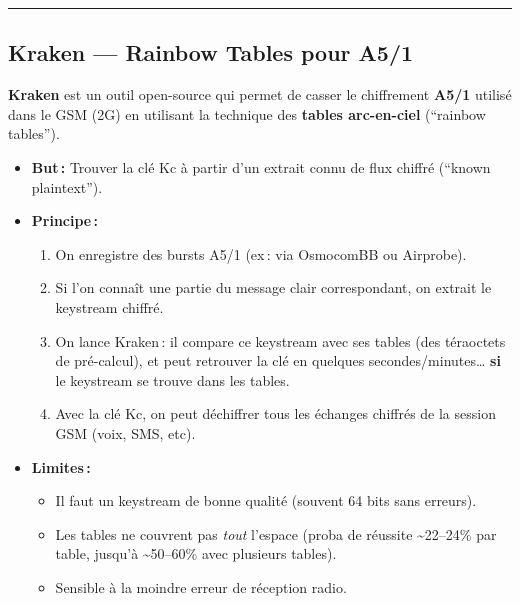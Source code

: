 \documentclass[
  french,
]{article}
\providecommand{\tightlist}{%
  \setlength{\itemsep}{0pt}\setlength{\parskip}{0pt}}
\begin{document}
\begin{center}\rule{0.5\linewidth}{0.5pt}\end{center}

\subsection{Kraken --- Rainbow Tables pour
A5/1}\label{kraken-rainbow-tables-pour-a51}

\textbf{Kraken} est un outil open-source qui permet de casser le
chiffrement \textbf{A5/1} utilisé dans le GSM (2G) en utilisant la
technique des \textbf{tables arc-en-ciel} (``rainbow tables'').

\begin{itemize}
\item
  \textbf{But\,:} Trouver la clé Kc à partir d'un extrait connu de flux
  chiffré (``known plaintext'').
\item
  \textbf{Principe\,:}

  \begin{enumerate}
  \def\labelenumi{\arabic{enumi}.}
  \tightlist
  \item
    On enregistre des bursts A5/1 (ex\,: via OsmocomBB ou Airprobe).
  \item
    Si l'on connaît une partie du message clair correspondant, on
    extrait le keystream chiffré.
  \item
    On lance Kraken\,: il compare ce keystream avec ses tables (des
    téraoctets de pré-calcul), et peut retrouver la clé en quelques
    secondes/minutes\ldots{} \textbf{si} le keystream se trouve dans les
    tables.
  \item
    Avec la clé Kc, on peut déchiffrer tous les échanges chiffrés de la
    session GSM (voix, SMS, etc).
  \end{enumerate}
\item
  \textbf{Limites\,:}

  \begin{itemize}
  \tightlist
  \item
    Il faut un keystream de bonne qualité (souvent 64 bits sans
    erreurs).
  \item
    Les tables ne couvrent pas \emph{tout} l'espace (proba de réussite
    \textasciitilde22--24\% par table, jusqu'à \textasciitilde50--60\%
    avec plusieurs tables).
  \item
    Sensible à la moindre erreur de réception radio.
  \end{itemize}
\end{itemize}
\end{document}
